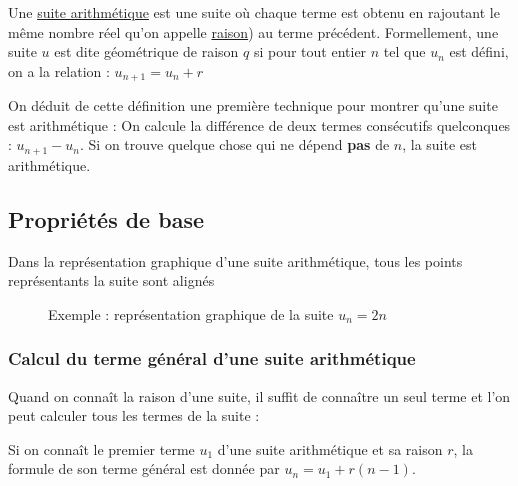 \documentclass[10pt,a4paper]{book}
\begin{document}
\begin{de}
Une \underline{suite arithmétique} est une suite où chaque terme est obtenu en rajoutant le même nombre réel qu'on appelle \underline{raison}) au terme précédent.
Formellement, une suite $u$ est dite géométrique de raison $q$ si pour tout entier $n$ tel que $u_n$ est défini, on a la relation : $u_{n+1} = u_n + r$ 
\end{de}

On déduit de cette définition une première technique pour montrer qu'une suite est arithmétique : On calcule la différence de deux termes consécutifs quelconques : $u_{n+1} - u_n$. Si on trouve quelque chose qui ne dépend \textbf{pas} de $n$, la suite est arithmétique.


\subsection{Propriétés de base}

\begin{prop}

Dans la représentation graphique d'une suite arithmétique, tous les points représentants la suite sont alignés
\end{prop}

\begin{figure}[!h]
  \caption{Exemple : représentation graphique de la suite $u_n=2n$}
    \centering
\end{figure}

\subsubsection{Calcul du terme général d'une suite arithmétique}

Quand on connaît la raison d'une suite, il suffit de connaître un seul terme et l'on peut calculer tous les termes de la suite :

\begin{prop}

Si on connaît le premier terme $u_1$ d'une suite arithmétique et sa raison $r$, la formule de son terme général est donnée par $u_n=u_1+r(n-1)$.
\end{prop}
\end{document}
